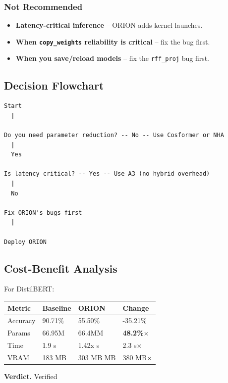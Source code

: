 \subsubsection{Not Recommended}

\begin{itemize}
\item \textbf{Latency-critical inference} -- ORION adds kernel launches.
\item \textbf{When \texttt{copy\_weights} reliability is critical} -- fix the bug first.
\item \textbf{When you save/reload models} -- fix the \texttt{rff\_proj} bug first.

\end{itemize}
\subsection{Decision Flowchart}

\begin{lstlisting}
Start
  |
   
Do you need parameter reduction? -- No -- Use Cosformer or NHA
  |
  Yes
   
Is latency critical? -- Yes -- Use A3 (no hybrid overhead)
  |
  No
   
Fix ORION's bugs first
  |
   
Deploy ORION
\end{lstlisting}

\subsection{Cost-Benefit Analysis}

For DistilBERT:

\begin{table}[H]
\centering
\small
\begin{tabular}{llll}
\toprule
\textbf{Metric} & \textbf{Baseline} & \textbf{ORION} & \textbf{Change} \\
\midrule
Accuracy & 90.71\% & 55.50\% & -35.21\% \\
Params & 66.95M & 66.4MM & \textbf{48.2\%$\times$} \\
Time & 1.9 s & 1.42x s & 2.3 s$\times$ \\
VRAM & 183 MB & 303 MB MB & 380 MB$\times$ \\
\bottomrule
\end{tabular}
\end{table}

\textbf{Verdict.} Verified

